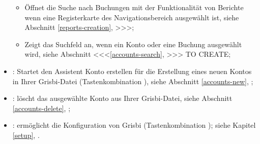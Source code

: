 \begin{itemize}
\begin{itemize}
		\item Öffnet die Suche nach Buchungen mit der Funktionalität von Berichte wenn eine Registerkarte des Navigationsbereich ausgewählt ist, siehe Abschnitt \vref{reports-creation}, >>>;%
		\item Zeigt das Suchfeld an, wenn ein Konto oder eine Buchung ausgewählt wird, siehe Abschnitt <<<\vref{accounts-search}, >>> TO CREATE; %
	\end{itemize}
	\item {}: Startet den Assistent Konto erstellen für die Erstellung eines neuen Kontos in Ihrer Grisbi-Datei (Tastenkombination ), siehe Abschnitt \vref{accounts-new}, ;%
	\item {}: löscht das ausgewählte Konto aus Ihrer Grisbi-Datei, siehe Abschnitt \vref{accounts-delete}, ;%
	\item {}: ermöglicht die Konfiguration von Grisbi (Tastenkombination ); siehe Kapitel \vref{setup}, .%
\end{itemize}


